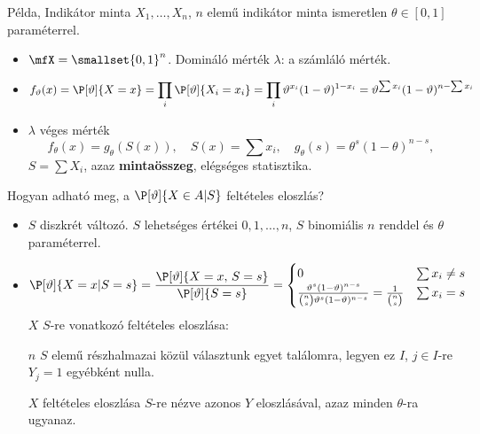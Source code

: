 \documentclass[aspectratio=169,notheorems,9pt,\option]{beamer}
\begin{document}
\begin{frame}{Példa, Indikátor minta}
  $X_1,\dots,X_n$, $n$ elemű indikátor minta ismeretlen $\theta\in[0,1]$ paraméterrel.
   \begin{itemize}
     \item $\mfX=\smallset{0,1}^n$. Domináló mérték $\lambda$: a számláló mérték.
     \item 
      \begin{displaymath}
        f_\theta(x) = \P[\theta]{X=x} 
        = \prod_i \P[\theta]{X_i=x_i}
        =\prod_{i} \theta^{x_i}(1-\theta)^{1-x_i}
        =\theta^{\sum x_i}(1-\theta)^{n-\sum x_i}
     \end{displaymath}
     \item $\lambda$ véges mérték
      \begin{displaymath}
        f_\theta(x)=g_\theta(S(x)),\quad S(x)=\sum x_i,\quad g_\theta(s)=\theta^s(1-\theta)^{n-s},
      \end{displaymath}
      $S=\sum X_i$, azaz \textbf{mintaösszeg}, elégséges statisztika. 
   \end{itemize}
   \continue
   Hogyan adható meg, a $\P[\theta]{X\in A|S}$ feltételes eloszlás?
   \pause
   \begin{itemize}
     \item $S$ diszkrét változó. $S$ lehetséges értékei $0,1,\dots,n$, $S$ binomiális $n$ renddel és $\theta$ paraméterrel.
     \item 
      \begin{displaymath}
        \P[\theta]{X=x|S=s}=
        \frac{\P[\theta]{X=x,\,S=s}}{\P[\theta]{S=s}}=
        \begin{cases}
          0& \sum x_i\neq s\\
          \frac{\theta^s(1-\theta)^{n-s}}{\binom ns \theta^s(1-\theta)^{n-s}}=\frac1{\binom ns} & \sum x_i=s 
        \end{cases}
      \end{displaymath}
      \continue
      $X$ $S$-re vonatkozó feltételes eloszlása: 
        
      $n$ $S$ elemű részhalmazai közül választunk egyet találomra, legyen ez $I$,
      $j\in I$-re $Y_j=1$ egyébként nulla. 
      
      \pause
      $X$ feltételes eloszlása $S$-re nézve azonos $Y$ eloszlásával, azaz minden $\theta$-ra ugyanaz.
   \end{itemize}
\end{frame}
\end{document}
